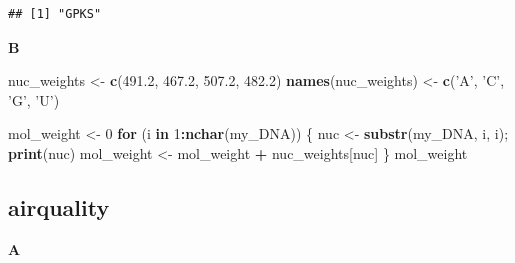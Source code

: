 \documentclass[]{book}
\newenvironment{Shaded}{\begin{snugshade}}{\end{snugshade}}
\newcommand{\ControlFlowTok}[1]{\textcolor[rgb]{0.13,0.29,0.53}{\textbf{#1}}}
\newcommand{\DataTypeTok}[1]{\textcolor[rgb]{0.13,0.29,0.53}{#1}}
\newcommand{\DecValTok}[1]{\textcolor[rgb]{0.00,0.00,0.81}{#1}}
\newcommand{\FloatTok}[1]{\textcolor[rgb]{0.00,0.00,0.81}{#1}}
\newcommand{\KeywordTok}[1]{\textcolor[rgb]{0.13,0.29,0.53}{\textbf{#1}}}
\newcommand{\NormalTok}[1]{#1}
\newcommand{\OperatorTok}[1]{\textcolor[rgb]{0.81,0.36,0.00}{\textbf{#1}}}
\newcommand{\StringTok}[1]{\textcolor[rgb]{0.31,0.60,0.02}{#1}}
\begin{document}
\begin{verbatim}
## [1] "GPKS"
\end{verbatim}

\textbf{B}

\begin{Shaded}
\begin{Highlighting}[]
\NormalTok{nuc_weights <-}\StringTok{ }\KeywordTok{c}\NormalTok{(}\FloatTok{491.2}\NormalTok{, }\FloatTok{467.2}\NormalTok{, }\FloatTok{507.2}\NormalTok{, }\FloatTok{482.2}\NormalTok{)}
\KeywordTok{names}\NormalTok{(nuc_weights) <-}\StringTok{ }\KeywordTok{c}\NormalTok{(}\StringTok{'A'}\NormalTok{, }\StringTok{'C'}\NormalTok{, }\StringTok{'G'}\NormalTok{, }\StringTok{'U'}\NormalTok{)}

\NormalTok{mol_weight <-}\StringTok{ }\DecValTok{0}
\ControlFlowTok{for}\NormalTok{ (i }\ControlFlowTok{in} \DecValTok{1}\OperatorTok{:}\KeywordTok{nchar}\NormalTok{(my_DNA)) \{}
\NormalTok{        nuc <-}\StringTok{ }\KeywordTok{substr}\NormalTok{(my_DNA, i, i);}
        \KeywordTok{print}\NormalTok{(nuc)}
\NormalTok{        mol_weight <-}\StringTok{ }\NormalTok{mol_weight }\OperatorTok{+}\StringTok{ }\NormalTok{nuc_weights[nuc]}
\NormalTok{\}}
\NormalTok{mol_weight}
\end{Highlighting}
\end{Shaded}

\hypertarget{airquality-1}{%
\subsection{airquality}\label{airquality-1}}

\textbf{A}

\begin{Shaded}
\end{Shaded}
\end{document}
